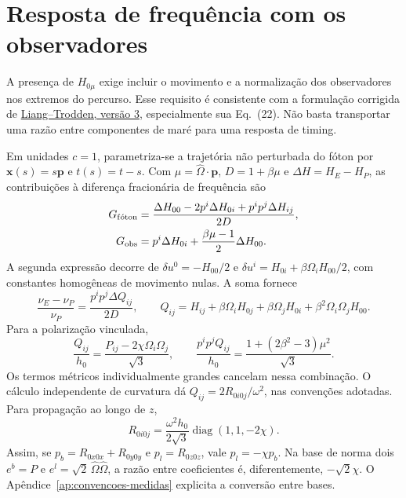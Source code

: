 \section{Resposta de frequência com os observadores}

A presença de $H_{0\mu}$ exige incluir o movimento e a normalização dos observadores nos extremos do percurso. Esse requisito é consistente com a formulação corrigida de \href{https://arxiv.org/pdf/2108.05344v3}{Liang--Trodden, versão 3}, especialmente sua Eq.~(22). Não basta transportar uma razão entre componentes de maré para uma resposta de timing.

Em unidades $c=1$, parametriza-se a trajetória não perturbada do fóton por $\boldsymbol{x}(s)=s\boldsymbol p$ e $t(s)=t-s$. Com $\mu=\widehat\Omega\cdot\boldsymbol p$, $D=1+\beta\mu$ e $\Delta H=H_E-H_P$, as contribuições à diferença fracionária de frequência são
\begin{align}
 G_{\rm f\acute oton}&=\frac{\Delta H_{00}-2p^i\Delta H_{0i}+p^ip^j\Delta H_{ij}}{2D},\\
 G_{\rm obs}&=p^i\Delta H_{0i}+\frac{\beta\mu-1}{2}\Delta H_{00}.
\end{align}
A segunda expressão decorre de $\delta u^0=-H_{00}/2$ e $\delta u^i=H_{0i}+\beta\Omega_iH_{00}/2$, com constantes homogêneas de movimento nulas. A soma fornece
\begin{equation}
 \frac{\nu_E-\nu_P}{\nu_P}=\frac{p^ip^j\Delta Q_{ij}}{2D},\qquad
 Q_{ij}=H_{ij}+\beta\Omega_iH_{0j}+\beta\Omega_jH_{0i}+\beta^2\Omega_i\Omega_jH_{00}.
\end{equation}
Para a polarização vinculada,
\begin{equation}
 \frac{Q_{ij}}{h_0}=\frac{P_{ij}-2\chi\Omega_i\Omega_j}{\sqrt3},\qquad
 \frac{p^ip^jQ_{ij}}{h_0}=\frac{1+(2\beta^2-3)\mu^2}{\sqrt3}.
 \label{eq:c10-q-observavel}
\end{equation}
Os termos métricos individualmente grandes cancelam nessa combinação. O cálculo independente de curvatura dá $Q_{ij}=2R_{0i0j}/\omega^2$, nas convenções adotadas. Para propagação ao longo de $z$,
\begin{equation}
 R_{0i0j}=\frac{\omega^2h_0}{2\sqrt3}\operatorname{diag}(1,1,-2\chi).
\end{equation}
Assim, se $p_b=R_{0x0x}+R_{0y0y}$ e $p_l=R_{0z0z}$, vale $p_l=-\chi p_b$. Na base de norma dois $e^b=P$ e $e^l=\sqrt2\,\widehat\Omega\widehat\Omega$, a razão entre coeficientes é, diferentemente, $-\sqrt2\chi$. O Apêndice~\ref{ap:convencoes-medidas} explicita a conversão entre bases.

